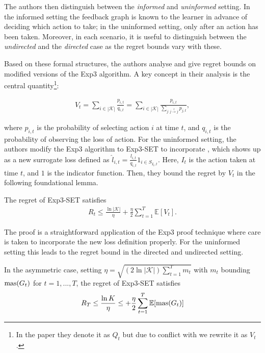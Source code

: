 The authors then distinguish between the \textit{informed} and \textit{uninformed} setting. In the informed setting the feedback graph is known to the learner in advance of deciding which action to take; in the uninformed setting, only after an action has been taken. Moreover, in each scenario, it is useful to distinguish between the \textit{undirected} and the \textit{directed} case as the regret bounds vary with these. 

Based on these formal structures, the authors analyse and give regret bounds on modified versions of the Exp3 algorithm. A key concept in their analysis is the central quantity\footnote{In the paper they denote it as $Q_t$ but due to conflict with \citep{hazan} we rewrite it as $V_t$.}:

\begin{align}\label{alon:foundation}
	V_t=\sum_{i\in |\mathcal{K}|}\frac{p_{i,t}}{q_{i,t}} = \sum_{i\in |\mathcal{K}|}\frac{p_{i,t}}{\sum_{j:j\overset{t}{\to}j} p_{j,t}},
\end{align}

where $p_{i,t}$ is the probability of selecting action $i$ at time $t$, and $q_{i,t}$ is the probability of observing the loss of action. For the uninformed setting, the authors modify the Exp3 algorithm to Exp3-SET to incorporate \label{alon:foundation}, which shows up as a new surrogate loss defined as $\hat{l}_{i,t}=\frac{l_{i,t}}{q_{i,t}}1_{i\in S_{I_t,t}}$. Here, $I_t$ is the action taken at time $t$, and $1$ is the indicator function. Then, they bound the regret by $V_t$ in the following foundational lemma.

\begin{lemma}
	The regret of Exp3-SET satisfies
	\begin{align}
		R_t\leq \frac{\ln |\mathcal{K}|}{\eta} + \frac{\eta}{2}\sum_{t=1}^T\mathbb{E}[V_t].
	\end{align}
\end{lemma}

The proof is a straightforward application of the Exp3 proof technique where care is taken to incorporate the new loss definition properly. For the uninformed setting this leads to the regret bound in the directed and undirected setting.

\begin{theorem} \label{alon:undirected}
	In the asymmetric case, setting $\eta=\sqrt{(2\ln |\mathcal{K}|)\sum_{t=1}^Tm_t}$ with $m_t$ bounding $\text{mas}(G_t)$ for $t=1,...,T$, the regret of Exp3-SET satisfies 
	\begin{align}
		R_T\leq \frac{\ln K}{\eta} \leq +\frac{\eta}{2}\sum_{t=1}^T\mathbb{E}[\text{mas}(G_t)]
	\end{align}
\end{theorem} 

